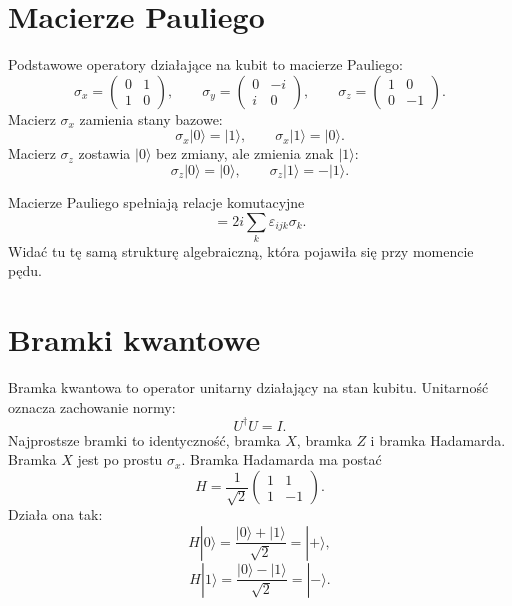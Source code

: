 \section{Macierze Pauliego}

Podstawowe operatory działające na kubit to macierze Pauliego:
\begin{equation}
    \sigma_x=\begin{pmatrix}0&1\\1&0\end{pmatrix},
    \qquad
    \sigma_y=\begin{pmatrix}0&-i\\i&0\end{pmatrix},
    \qquad
    \sigma_z=\begin{pmatrix}1&0\\0&-1\end{pmatrix}.
\end{equation}
Macierz \(\sigma_x\) zamienia stany bazowe:
\begin{equation}
    \sigma_x|0\rangle=|1\rangle,
    \qquad
    \sigma_x|1\rangle=|0\rangle.
\end{equation}
Macierz \(\sigma_z\) zostawia \(|0\rangle\) bez zmiany, ale zmienia znak \(|1\rangle\):
\begin{equation}
    \sigma_z|0\rangle=|0\rangle,
    \qquad
    \sigma_z|1\rangle=-|1\rangle.
\end{equation}

Macierze Pauliego spełniają relacje komutacyjne
\begin{equation}
    [\sigma_i,\sigma_j]=2i\sum_k\varepsilon_{ijk}\sigma_k.
\end{equation}
Widać tu tę samą strukturę algebraiczną, która pojawiła się przy momencie pędu.

\section{Bramki kwantowe}

Bramka kwantowa to operator unitarny działający na stan kubitu. Unitarność oznacza zachowanie normy:
\begin{equation}
    U^\dagger U=I.
\end{equation}
Najprostsze bramki to identyczność, bramka \(X\), bramka \(Z\) i bramka Hadamarda. Bramka \(X\) jest po prostu \(\sigma_x\). Bramka Hadamarda ma postać
\begin{equation}
    H=\frac{1}{\sqrt{2}}\begin{pmatrix}1&1\\1&-1\end{pmatrix}.
\end{equation}
Działa ona tak:
\begin{equation}
    H|0\rangle=\frac{|0\rangle+|1\rangle}{\sqrt{2}}=|+\rangle,
\end{equation}
\begin{equation}
    H|1\rangle=\frac{|0\rangle-|1\rangle}{\sqrt{2}}=|-\rangle.
\end{equation}

